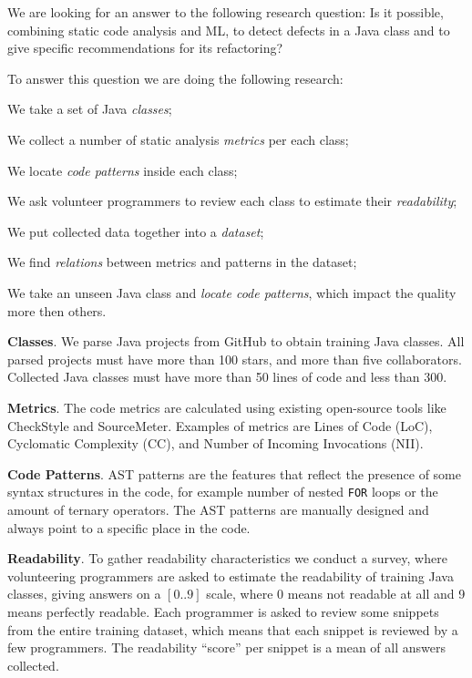 

We are looking for an answer to the following research question: 
Is it possible,
combining static code analysis and ML, 
to detect defects in a Java class and 
to give specific recommendations for its refactoring? 

To answer this question we are doing the following research:
\begin{enumerate*}[label={\alph*)}]
    \item We take a set of Java \emph{classes};
    \item We collect a number of static analysis \emph{metrics} per each class;
    \item We locate \emph{code patterns} inside each class;
    \item We ask volunteer programmers to review 
      each class to estimate their \emph{readability};
    \item We put collected data together into a \emph{dataset}; 
    \item We find \emph{relations} between metrics and patterns in the dataset; 
    \item We take an unseen Java class and \emph{locate code patterns}, which impact the quality more then others.
\end{enumerate*}
    
\textbf{Classes}.
We parse Java projects from GitHub to obtain training Java classes. 
All parsed projects must have more than 100 stars, and more than five collaborators. 
Collected Java classes must have more than 50 lines of code and less than 300.  

\textbf{Metrics}.
The code metrics are calculated using existing open-source
tools like CheckStyle and SourceMeter. Examples of metrics are Lines of Code (LoC), 
Cyclomatic Complexity (CC), and Number of Incoming Invocations (NII).

\textbf{Code Patterns}.
AST patterns are the features that reflect the presence 
of some syntax structures in the code, 
for example number of nested \texttt{FOR} loops 
or the amount of ternary operators. The AST patterns are manually designed 
and always point to a specific place in the code. 

\textbf{Readability}.
To gather readability characteristics we conduct
a survey, where volunteering programmers are asked to estimate
the readability of training Java classes, giving answers on a $[0..9]$ scale, 
where 0 means not readable at all and 9 means perfectly readable.
Each programmer is asked to review some snippets from 
the entire training dataset, which means that each
snippet is reviewed by a few programmers. The readability ``score'' per
snippet is a mean of all answers collected.

